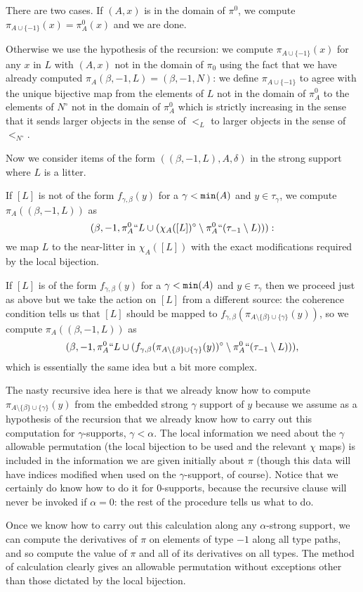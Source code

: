 \documentclass[112pt]{article}
\begin{document}
\begin{description}
There are two cases.  If $(A,x)$ is in the domain of $\pi^0$, we compute $\pi_{A \cup \{-1\}}(x) = \pi^0_A(x)$ and we are done.

Otherwise we use the hypothesis of the recursion:  we compute $\pi_{A \cup \{-1\}}(x)$ for any $x$ in $L$ with $(A,x)$ not in the domain of $\pi_0$ using the fact that we have already computed $\pi_A(\beta,-1,L) = (\beta,-1,N)$:  we define $\pi_{A \cup \{-1\}}$ to agree with the unique bijective map from the
elements of $L$ not in the domain of $\pi^0_A$ to the elements of $N^{\circ}$ not in the domain of $\pi^0_A$ which is strictly increasing in the sense that it sends larger objects in the sense of $<_L$ to larger objects in the sense of $<_{N^{\circ}}$.

Now we consider items of the form $((\beta,-1,L),A,\delta)$ in the strong support where $L$ is a litter.

If $[L]$ is not of the form $f_{\gamma,\beta}(y)$ for a $\gamma<{\tt min}(A)$ and $y \in \tau_\gamma$,
we compute $\pi_A((\beta,-1,L))$ as $$(\beta,-1,\pi^0_A``L \cup (\chi_A([L])^\circ \setminus \pi^0_A``(\tau_{-1} \setminus L))):$$ we map
$L$ to the near-litter in $\chi_A([L])$ with the exact modifications required by the local bijection.

If $[L]$ is of the form $f_{\gamma,\beta}(y)$ for a $\gamma<{\tt min}(A)$ and $y \in \tau_\gamma$ then we proceed just as above but we take the action on $[L]$ from a different source:
the coherence condition tells us that $[L]$ should be mapped to $f_{\gamma,\beta}(\pi_{A \setminus \{\beta\} \cup \{\gamma\}}(y))$, so we compute
$\pi_A((\beta,-1,L))$ as $$(\beta,-1,\pi^0_A``L \cup (f_{\gamma,\beta}(\pi_{A \setminus \{\beta\} \cup \{\gamma\}}(y))^\circ \setminus \pi^0_A``(\tau_{-1}\setminus L))),$$  which is essentially the same idea but a bit more complex.

The nasty recursive idea here is that we already know how to compute $\pi_{A \setminus \{\beta\} \cup \{\gamma\}}(y)$ from the embedded strong $\gamma$ support of $y$ because we assume as a hypothesis of the recursion that we already know how to carry out this computation for $\gamma$-supports, $\gamma<\alpha$.  The  local information we need about the $\gamma$ allowable permutation (the local bijection to be used and the relevant $\chi$ maps) is included in the information we are given initially about $\pi$ (though this data will have indices modified when used on the $\gamma$-support, of course).  Notice that we certainly do know how to do it for 0-supports, because the recursive clause will never be invoked if $\alpha=0$:  the rest of the procedure tells us what to do.

Once we know how to carry out this calculation along any $\alpha$-strong support, we can compute the derivatives of $\pi$ on elements of type $-1$  along all type paths, and so compute the value of $\pi$ and all of its derivatives on all types.  The method of calculation clearly gives an allowable permutation without exceptions other than those dictated by the local bijection.

\end{description}
\end{document}
